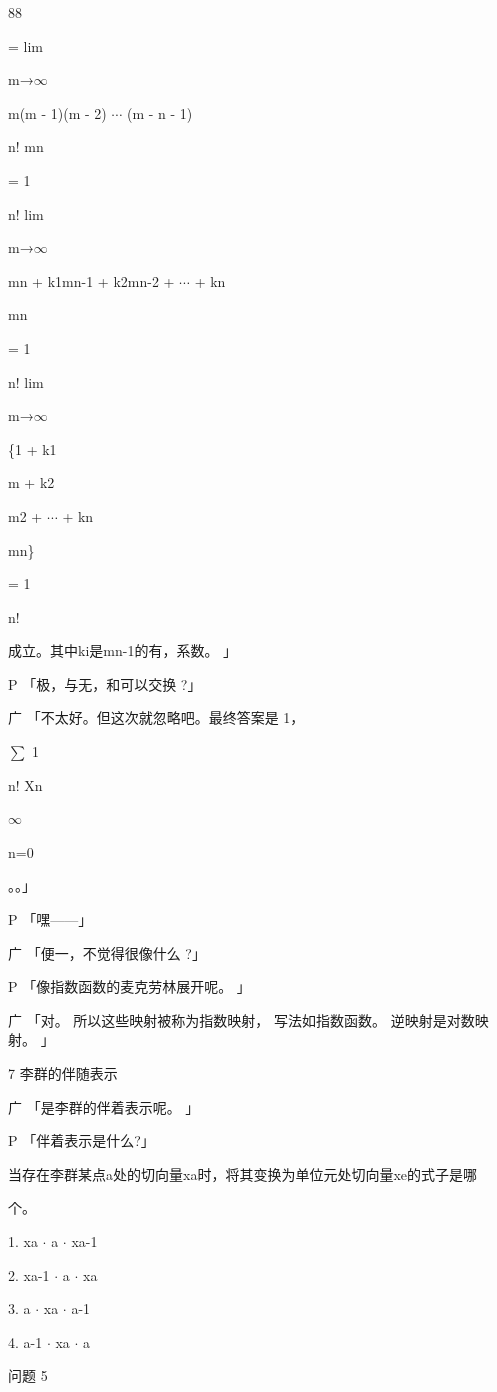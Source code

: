 88\par
= lim\par
m→$\infty$\par
m(m - 1)(m - 2) $\cdots$ (m - n - 1)\par
n! mn\par
= 1\par
n! lim\par
m→$\infty$\par
mn + k1mn-1 + k2mn-2 + $\cdots$ + kn\par
mn\par
= 1\par
n! lim\par
m→$\infty$\par
\{1 + k1\par
m + k2\par
m2 + $\cdots$ + kn\par
mn\}\par
= 1\par
n!\par
成立。其中ki是mn-1的有，系数。 」\par
P 「极，与无，和可以交换 ?」\par
广 「不太好。但这次就忽略吧。最终答案是 1，\par
$\sum$ 1\par
n! Xn\par
$\infty$\par
n=0\par
。。」\par
P 「嘿——」\par
广 「便一，不觉得很像什么 ?」\par
P 「像指数函数的麦克劳林展开呢。 」\par
广 「对。 所以这些映射被称为指数映射， 写法如指数函数。 逆映射是对数映射。 」\par
7 李群的伴随表示\par
广 「是李群的伴着表示呢。 」\par
P 「伴着表示是什么?」\par
当存在李群某点a处的切向量xa时，将其变换为单位元处切向量xe的式子是哪\par
个。\par
1. xa $\cdot$ a $\cdot$ xa-1\par
2. xa-1 $\cdot$ a $\cdot$ xa\par
3. a $\cdot$ xa $\cdot$ a-1\par
4. a-1 $\cdot$ xa $\cdot$ a\par
问题 5\par

